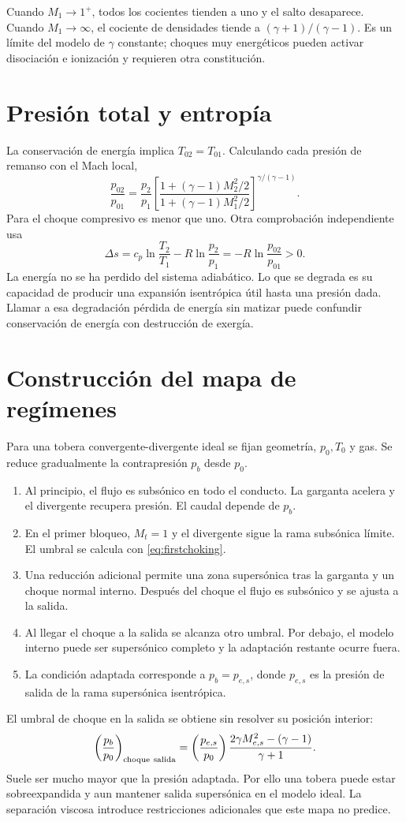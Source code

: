 Cuando $M_1\to1^+$, todos los cocientes tienden a uno y el salto desaparece. Cuando $M_1\to\infty$, el cociente de densidades tiende a $(\gamma+1)/(\gamma-1)$. Es un límite del modelo de $\gamma$ constante; choques muy energéticos pueden activar disociación e ionización y requieren otra constitución.
\section{Presión total y entropía}
La conservación de energía implica $T_{02}=T_{01}$. Calculando cada presión de remanso con el Mach local,
\begin{equation}\label{eq:p0shock}
 \frac{p_{02}}{p_{01}}=\frac{p_2}{p_1}
 \left[\frac{1+(\gamma-1)M_2^2/2}
 {1+(\gamma-1)M_1^2/2}\right]^{\gamma/(\gamma-1)}.
\end{equation}
Para el choque compresivo es menor que uno. Otra comprobación independiente usa
\[
 \Delta s=c_p\ln\frac{T_2}{T_1}-R\ln\frac{p_2}{p_1}
 =-R\ln\frac{p_{02}}{p_{01}}>0.
\]
La energía no se ha perdido del sistema adiabático. Lo que se degrada es su capacidad de producir una expansión isentrópica útil hasta una presión dada. Llamar a esa degradación pérdida de energía sin matizar puede confundir conservación de energía con destrucción de exergía.
\section{Construcción del mapa de regímenes}
Para una tobera convergente-divergente ideal se fijan geometría, $p_0,T_0$ y gas. Se reduce gradualmente la contrapresión $p_b$ desde $p_0$.
\begin{enumerate}
\item Al principio, el flujo es subsónico en todo el conducto. La garganta acelera y el divergente recupera presión. El caudal depende de $p_b$.
\item En el primer bloqueo, $M_t=1$ y el divergente sigue la rama subsónica límite. El umbral se calcula con \eqref{eq:firstchoking}.
\item Una reducción adicional permite una zona supersónica tras la garganta y un choque normal interno. Después del choque el flujo es subsónico y se ajusta a la salida.
\item Al llegar el choque a la salida se alcanza otro umbral. Por debajo, el modelo interno puede ser supersónico completo y la adaptación restante ocurre fuera.
\item La condición adaptada corresponde a $p_b=p_{e,s}$, donde $p_{e,s}$ es la presión de salida de la rama supersónica isentrópica.
\end{enumerate}
El umbral de choque en la salida se obtiene sin resolver su posición interior:
\begin{equation}\label{eq:shockexit}
 \left(\frac{p_b}{p_0}\right)_{\rm choque\ salida}=
 \left(\frac{p_{e,s}}{p_0}\right)
 \frac{2\gamma M_{e,s}^2-(\gamma-1)}{\gamma+1}.
\end{equation}
Suele ser mucho mayor que la presión adaptada. Por ello una tobera puede estar sobreexpandida y aun mantener salida supersónica en el modelo ideal. La separación viscosa introduce restricciones adicionales que este mapa no predice.\cite{MIT03}
